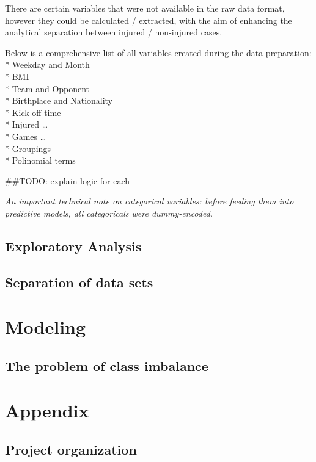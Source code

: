 \documentclass[]{article}
\begin{document}
There are certain variables that were not available in the raw data
format, however they could be calculated / extracted, with the aim of
enhancing the analytical separation between injured / non-injured cases.

Below is a comprehensive list of all variables created during the data
preparation:\\
* Weekday and Month\\
* BMI\\
* Team and Opponent\\
* Birthplace and Nationality\\
* Kick-off time\\
* Injured \ldots{}\\
* Games \ldots{}\\
* Groupings\\
* Polinomial terms

{\#\#TODO: explain logic for each}

\emph{An important technical note on categorical variables: before
feeding them into predictive models, all categoricals were
dummy-encoded.}

\subsection{Exploratory Analysis}\label{exploratory-analysis}

\subsection{Separation of data sets}\label{separation-of-data-sets}

\section{Modeling}\label{modeling}

\subsection{The problem of class
imbalance}\label{the-problem-of-class-imbalance}

\section{Appendix}\label{appendix}

\subsection{Project organization}\label{project-organization}
\end{document}

